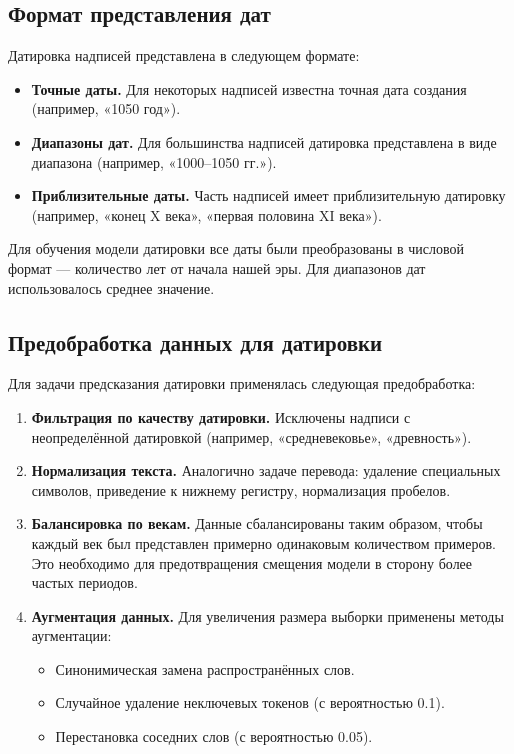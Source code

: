 \documentclass[14pt,a4paper]{extreport}
\begin{document}
\subsection{Формат представления дат}

Датировка надписей представлена в следующем формате:
\begin{itemize}
    \item \textbf{Точные даты.} Для некоторых надписей известна точная дата создания (например, «1050 год»).
    \item \textbf{Диапазоны дат.} Для большинства надписей датировка представлена в виде диапазона (например, «1000--1050 гг.»).
    \item \textbf{Приблизительные даты.} Часть надписей имеет приблизительную датировку (например, «конец X века», «первая половина XI века»).
\end{itemize}

Для обучения модели датировки все даты были преобразованы в числовой формат — количество лет от начала нашей эры. Для диапазонов дат использовалось среднее значение.

\subsection{Предобработка данных для датировки}

Для задачи предсказания датировки применялась следующая предобработка:

\begin{enumerate}
    \item \textbf{Фильтрация по качеству датировки.} Исключены надписи с неопределённой датировкой (например, «средневековье», «древность»).
    
    \item \textbf{Нормализация текста.} Аналогично задаче перевода: удаление специальных символов, приведение к нижнему регистру, нормализация пробелов.
    
    \item \textbf{Балансировка по векам.} Данные сбалансированы таким образом, чтобы каждый век был представлен примерно одинаковым количеством примеров. Это необходимо для предотвращения смещения модели в сторону более частых периодов.
    
    \item \textbf{Аугментация данных.} Для увеличения размера выборки применены методы аугментации:
    \begin{itemize}
        \item Синонимическая замена распространённых слов.
        \item Случайное удаление неключевых токенов (с вероятностью 0.1).
        \item Перестановка соседних слов (с вероятностью 0.05).
    \end{itemize}
\end{enumerate}
\end{document}
